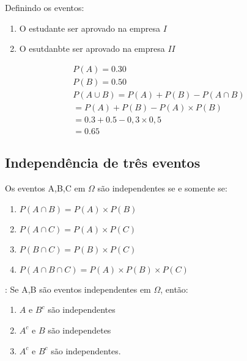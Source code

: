\documentclass[11pt,a4paper]{book}
\begin{document}
\begin{description}
\begin{description}
 Definindo os eventos:

 \begin{enumerate}[label=\Alph*:]
   \item  O estudante ser aprovado na empresa $I$
   \item  O esutdanbte ser aprovado na empresa $II$
 \end{enumerate}
 \begin{align*}
   P(A)= 0.30\\
   P(B)=0.50\\
   P(A\cup B)= P(A)+P(B)-P(A\cap B)\\
   =P(A)+P(B)-P(A)\times P(B)\\
   =0.3+0.5- 0,3 \times 0,5\\
   =0.65
 \end{align*}
 \end{description}
 \subsection{Independência de três eventos}
 Os eventos A,B,C em $\Omega$ são independentes se e somente se:
 \begin{description}

 \begin{enumerate}[label=(\alph*)]
   \item $P(A \cap B) = P(A)\times P(B)$ 

   \item $P(A \cap C) = P(A)\times P(C)$

   \item $P(B \cap C)= P(B)\times P(C)$

   \item $P(A \cap B \cap C)= P(A)\times P(B) \times P(C)$
 \end{enumerate}

 \item [Resultado]: Se A,B são eventos independentes em $\Omega$, então:

 \begin{enumerate}[leftmargin=*, label=\Roman*., widest=IV, align=left]
   \item $A$ e $B^c$ são independentes
   \item $A^c$ e $B$ são independetes
   \item $A^c$ e $B^c$ são independentes.
 \end{enumerate}
 \begin{figure}
   \label{fig:19}
 \end{figure}


\end{description}
\end{description}
\end{document}
